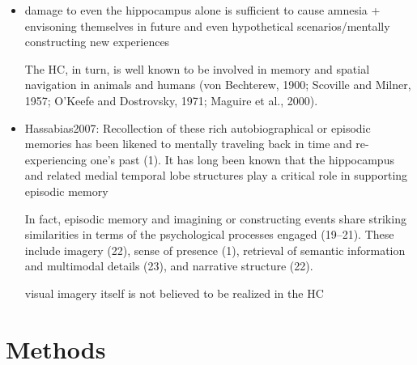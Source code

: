 \documentclass{article} %
\begin{document}
\begin{itemize}
\begin{itemize}
\item
damage to even the hippocampus alone is sufficient to cause amnesia +
envisoning themselves in future and even hypothetical scenarios/mentally constructing new experiences

The HC, in turn, is well known to be involved in memory and spatial navigation in animals and humans (von Bechterew, 1900; Scoville and Milner, 1957; O’Keefe and Dostrovsky, 1971; Maguire et al., 2000). 

\item
Hassabias2007:
Recollection of these rich autobiographical or episodic memories has been likened to mentally traveling back in time and re-experiencing one’s past (1). It has long been known that the hippocampus and related medial temporal lobe structures play a critical role in supporting episodic memory

In fact, episodic memory and imagining or constructing events share striking similarities in terms of the psychological processes engaged (19–21). These include imagery (22), sense of presence (1), retrieval of semantic information and multimodal details (23), and narrative structure (22).

visual imagery itself is not believed to be realized in the HC

  \end{itemize}
\end{itemize}




\section{Methods}
\end{document}
